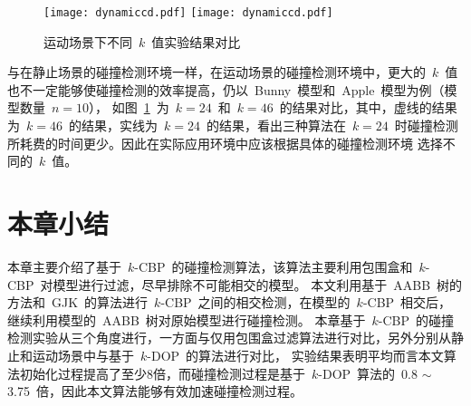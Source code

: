 \begin{figure}[H] 
\centering
{}
{  
   \texttt{[image: dynamiccd.pdf]}
}
{  
    \texttt{[image: dynamiccd.pdf]}
}
\caption{运动场景下不同~$k$~值实验结果对比}
\label{fig:chart:exp:kdop:kcbp:k24:k46:dynamic}
\end{figure}

与在静止场景的碰撞检测环境一样，在运动场景的碰撞检测环境中，更大的~$k$~值也不一定能够使碰撞检测的效率提高，仍以~Bunny~模型和~Apple~模型为例（模型数量~$n=10$），
如图~\ref{fig:chart:exp:kdop:kcbp:k24:k46:dynamic}~为~$k=24$~和~$k=46$~的结果对比，其中，虚线的结果为~$k=46$~的结果，实线为~$k=24$~的结果，看出三种算法在~$k=24$~时碰撞检测所耗费的时间更少。因此在实际应用环境中应该根据具体的碰撞检测环境
选择不同的~$k$~值。

\FloatBarrier
\section{本章小结}
\label{sec:chap03:summary}

本章主要介绍了基于~$k$-CBP~的碰撞检测算法，该算法主要利用包围盒和~$k$-CBP~对模型进行过滤，尽早排除不可能相交的模型。
本文利用基于~AABB~树的方法和~GJK~的算法进行~$k$-CBP~之间的相交检测，在模型的~$k$-CBP~相交后，继续利用模型的~AABB~树对原始模型进行碰撞检测。
本章基于~$k$-CBP~的碰撞检测实验从三个角度进行，一方面与仅用包围盒过滤算法进行对比，另外分别从静止和运动场景中与基于~$k$-DOP~的算法进行对比，
实验结果表明平均而言本文算法初始化过程提高了至少8倍，而碰撞检测过程是基于~$k$-DOP~算法的~0.8 $\sim$ 3.75~倍，因此本文算法能够有效加速碰撞检测过程。

